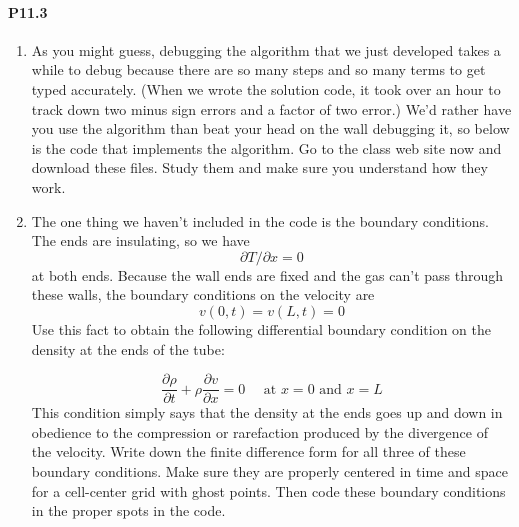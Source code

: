 \paragraph*{P11.3}
\begin{enumerate}[label=(\alph*)]
	\item As you might guess, debugging the algorithm that we just developed takes a while to debug because there are so many steps and so many terms to get typed accurately. (When we wrote the solution code, it took over an hour to track down two minus sign errors and a factor of two error.) We\rq d rather have you use the algorithm than beat your head on the wall debugging it, so below is the code that implements the algorithm. Go to the class web site now and download these files. Study them and make sure you understand how they work.
	\item The one thing we haven\rq t included in the code is the boundary conditions. The ends are insulating, so we have
	\begin{equation}\label{eq:1128}
\partial T / \partial x=0
\end{equation}
at both ends. Because the wall ends are fixed and the gas can\rq t pass through these walls, the boundary conditions on the velocity are
\begin{equation}\label{eq:1129}
v(0, t)=v(L, t)=0
\end{equation}
Use this fact to obtain the following differential boundary condition
on the density at the ends of the tube:

\begin{equation}\label{eq:1130}
\frac{\partial \rho}{\partial t}+\rho \frac{\partial v}{\partial x}=0 \quad \text { at } x=0 \text { and } x=L
\end{equation}
This condition simply says that the density at the ends goes up and
down in obedience to the compression or rarefaction produced by the
divergence of the velocity.
Write down the finite difference form for all three of these boundary
conditions. Make sure they are properly centered in time and space
for a cell-center grid with ghost points. Then code these boundary
conditions in the proper spots in the code.

\end{enumerate}

